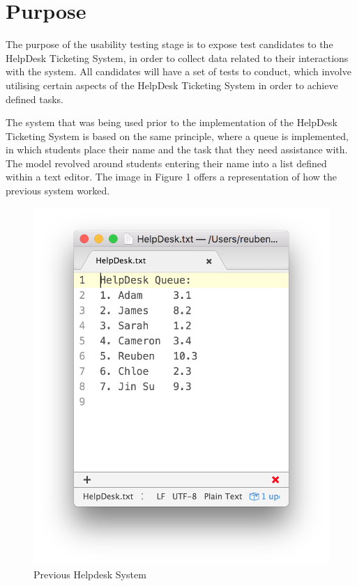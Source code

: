 \documentclass[12pt,a4paper,]{article}
\date{}
\begin{document}
{
\setcounter{tocdepth}{3}
\tableofcontents
}
\newpage
\section{Purpose}\label{purpose}

The purpose of the usability testing stage is to expose test candidates
to the HelpDesk Ticketing System, in order to collect data related to
their interactions with the system. All candidates will have a set of
tests to conduct, which involve utilising certain aspects of the
HelpDesk Ticketing System in order to achieve defined tasks.

The system that was being used prior to the implementation of the
HelpDesk Ticketing System is based on the same principle, where a queue
is implemented, in which students place their name and the task that
they need assistance with. The model revolved around students entering
their name into a list defined within a text editor. The image in Figure
1 offers a representation of how the previous system worked.

\begin{figure}[htbp]
\centering
\includegraphics{1.png}
\caption{Previous Helpdesk System}
\end{figure}
\end{document}
